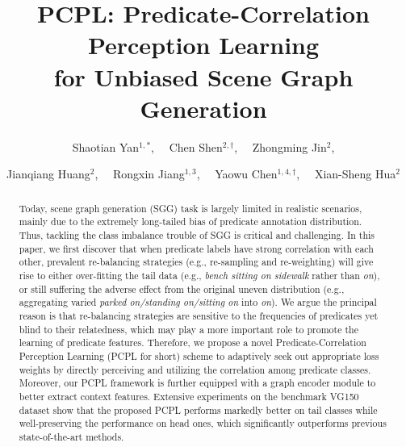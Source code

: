 \documentclass[sigconf]{acmart}
\begin{document}
\fancyhead{}
\title{PCPL: Predicate-Correlation Perception Learning \\ for Unbiased Scene Graph Generation}

\author{Shaotian Yan$^{1,*}$, \ \ Chen Shen$^{2,{\dagger}}$, \ \ Zhongming Jin$^{2}$, }
\author{Jianqiang Huang$^{2}$, \ \ Rongxin Jiang$^{1,3}$, \ \ Yaowu Chen$^{1,4,{\dagger}}$, \ \ Xian-Sheng Hua$^{2}$ }


\renewcommand{\shortauthors}{Yan et al.}
\renewcommand{\thefootnote}{\fnsymbol{footnote}}
\begin{abstract}
  Today, scene graph generation (SGG) task is largely limited in realistic scenarios, mainly due to the extremely long-tailed bias of predicate annotation distribution.
  Thus, tackling the class imbalance trouble of SGG is critical and challenging. 
  In this paper, we first discover that when predicate labels have strong correlation with each other, prevalent re-balancing strategies (e.g., re-sampling and re-weighting) will give rise to either over-fitting the tail data (e.g., \emph{bench sitting on sidewalk} rather than \emph{on}), or still suffering the adverse effect from the original uneven distribution (e.g., aggregating varied \emph{parked on/standing on/sitting on} into \emph{on}). 
  We argue the principal reason is that re-balancing strategies are sensitive to the frequencies of predicates yet blind to their relatedness, which may play a more important role to promote the learning of predicate features.
  Therefore, we propose a novel Predicate-Correlation Perception Learning (PCPL for short) scheme to adaptively seek out appropriate loss weights by directly perceiving and utilizing the correlation among predicate classes. 
  Moreover, our PCPL framework is further equipped with a graph encoder module to better extract context features. Extensive experiments on the benchmark VG150 dataset show that the proposed PCPL performs markedly better on tail classes while well-preserving the performance on head ones,  which significantly outperforms previous state-of-the-art methods.
\end{abstract}
\end{document}
